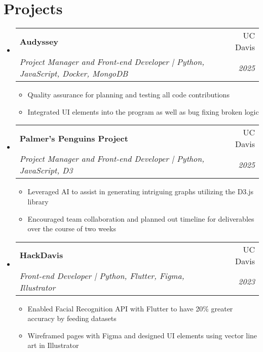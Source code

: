 \documentclass[letterpaper,11pt]{article}
\makeatletter
\newcommand{\resumeItem}[2]{
  \item\small{
    \textbf{#1}{: #2 \vspace{-2pt}}
  }
}
\newcommand{\resumeSubheading}[4]{
  \vspace{-1pt}\item
    \begin{tabular*}{0.97\textwidth}[t]{l@{\extracolsep{\fill}}r}
      \textbf{#1} & #2 \\
      \textit{\small#3} & \textit{\small #4} \\
    \end{tabular*}\vspace{-5pt}
}
\newcommand{\resumeSubHeadingListStart}{\begin{itemize}[leftmargin=*]}
\newcommand{\resumeSubHeadingListEnd}{\end{itemize}}
\newcommand{\resumeItemListStart}{\begin{itemize}}
\newcommand{\resumeItemListEnd}{\end{itemize}\vspace{-5pt}}
\makeatother
\begin{document}
        \begin{comment}
        \resumeSubheading
            {Front-end Assistant}{July 2023 -- August 2024}
            {Costco}{Redmond, WA}
            \resumeItemListStart
                \resumeItem{Worked as a front-end assistant doing a variety of jobs such as cashiering, customer service, security, advertising, and inventory management}
                {
                    \begin{itemize}
                    \item Achieved 40\% increased efficiency in inventory itemization compared to peers
                    \item Efficiency with POS and AS/400 systems
                    \item Independent problem-solving and dealing with difficult customers
                    \end{itemize}
                }
            \resumeItemListEnd
        \resumeSubHeadingListEnd
        \end{comment}
\section{Projects}
\resumeSubHeadingListStart
    \resumeSubheading
        {Audyssey}{UC Davis}
        {Project Manager and Front-end Developer | Python, JavaScript, Docker, MongoDB}{2025}
        \resumeItemListStart
            \begin{itemize}
                \item Quality assurance for planning and testing all code contributions
                \item Integrated UI elements into the program as well as bug fixing broken logic
            \end{itemize}
        \resumeItemListEnd
    \resumeSubheading
        {Palmer's Penguins Project}{UC Davis}
        {Project Manager and Front-end Developer | Python, JavaScript, D3}{2025}
        \resumeItemListStart
            \begin{itemize}
                \item Leveraged AI to assist in generating intriguing graphs utilizing the D3.js library
                \item Encouraged team collaboration and planned out timeline for deliverables over the course of two weeks
            \end{itemize}
        \resumeItemListEnd
    \resumeSubheading
        {HackDavis}{UC Davis}
        {Front-end Developer | Python, Flutter, Figma, Illustrator}{2023}
        \resumeItemListStart
            \begin{itemize}
                \item Enabled Facial Recognition API with Flutter to have 20\% greater accuracy by feeding datasets
                \item Wireframed pages with Figma and designed UI elements using vector line art in Illustrator
            \end{itemize}
        \resumeItemListEnd
\resumeSubHeadingListEnd
\end{document}
